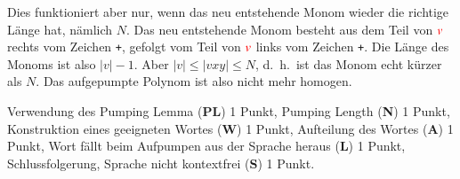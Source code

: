 \begin{diskussion}
\begin{center}
\end{center}
Dies funktioniert
aber nur, wenn das neu entstehende Monom wieder die richtige
Länge hat, nämlich $N$. Das neu entstehende Monom besteht
aus dem Teil von $\color{red}v$ rechts vom Zeichen \texttt{+},
gefolgt vom Teil von $\color{red}v$ links vom Zeichen \texttt{+}.
Die Länge des Monoms ist also $|v|-1$. Aber $|v|\le |vxy|\le N$,
d.~h.~ist das Monom echt kürzer als $N$. Das aufgepumpte Polynom ist
also nicht mehr homogen.
\end{diskussion}

\begin{bewertung}
Verwendung des Pumping Lemma ({\bf PL}) 1 Punkt,
Pumping Length ({\bf N}) 1 Punkt,
Konstruktion eines geeigneten Wortes ({\bf W}) 1 Punkt,
Aufteilung des Wortes ({\bf A}) 1 Punkt,
Wort fällt beim Aufpumpen aus der Sprache heraus ({\bf L}) 1 Punkt,
Schlussfolgerung, Sprache nicht kontextfrei ({\bf S}) 1 Punkt.
\end{bewertung}

